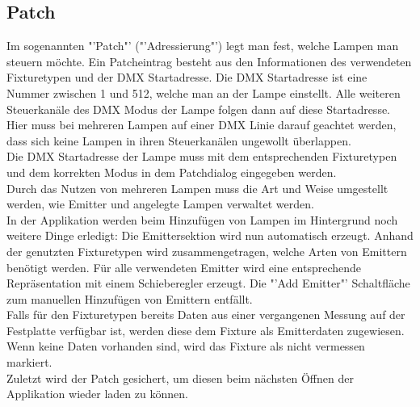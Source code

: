 \documentclass[11pt]{scrartcl}
\begin{document}
\subsection{Patch}
Im sogenannten "'Patch"' ("'Adressierung"') legt man fest, welche Lampen man steuern möchte. Ein Patcheintrag besteht aus den Informationen
des verwendeten Fixturetypen und der DMX Startadresse. Die DMX Startadresse ist eine Nummer zwischen 1 und 512, welche man an der Lampe einstellt.
Alle weiteren Steuerkanäle des DMX Modus der Lampe folgen dann auf diese Startadresse. Hier muss bei mehreren Lampen auf einer DMX Linie darauf geachtet
werden, dass sich keine Lampen in ihren Steuerkanälen ungewollt überlappen.\\
Die DMX Startadresse der Lampe muss mit dem entsprechenden Fixturetypen und dem korrekten Modus in dem Patchdialog eingegeben werden.\\
Durch das Nutzen von mehreren Lampen muss die Art und Weise umgestellt werden, wie Emitter und angelegte Lampen verwaltet werden.\\
In der Applikation werden beim Hinzufügen von Lampen im Hintergrund noch weitere Dinge erledigt: Die Emittersektion wird nun automatisch erzeugt. Anhand der
genutzten Fixturetypen wird zusammengetragen, welche Arten von Emittern benötigt werden. Für alle verwendeten Emitter wird eine entsprechende Repräsentation mit
einem Schieberegler erzeugt. Die "'Add Emitter"' Schaltfläche zum manuellen Hinzufügen von Emittern entfällt.\\
Falls für den Fixturetypen bereits Daten aus einer vergangenen Messung auf der Festplatte verfügbar ist, werden diese dem Fixture als Emitterdaten zugewiesen.
Wenn keine Daten vorhanden sind, wird das Fixture als nicht vermessen markiert.\\
Zuletzt wird der Patch gesichert, um diesen beim nächsten Öffnen der Applikation wieder laden zu können.
\end{document}

